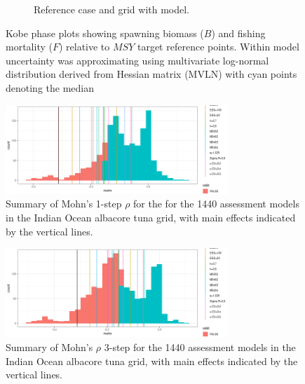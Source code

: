 \begin{figure}
\begin{subfigure}[b]{0.5\textwidth}
                \caption{Reference case and grid with model.}
                \label{fig:kobe-bg}
     \end{subfigure}%
    \caption{Kobe phase plots showing spawning biomass ($B$) and fishing mortality ($F$) relative to $MSY$ target reference points. Within model uncertainty was approximating using multivariate log-normal distribution derived from Hessian matrix (MVLN) with cyan points denoting the median}\label{fig:kobe}
\end{figure}

\clearpage
\newpage
\begin{figure}[ht!]\centering\includegraphics[width=0.75\textwidth]{figures/mohn-hist-1-1.png}  \caption{Summary of Mohn's 1-step $\rho$ for the for the 1440 assessment models in the Indian Ocean albacore tuna grid, with main effects indicated by the vertical lines.} 
\label{fig:mohn-1}       
\end{figure}

\begin{figure}[ht!]\centering\includegraphics[width=0.75\textwidth]{figures/mohn-hist-1.png}  \caption{Summary of Mohn's $\rho$ 3-step for the 1440 assessment models in the Indian Ocean albacore tuna grid, with main effects indicated by the vertical lines.} 
\label{fig:mohn}       
\end{figure}




